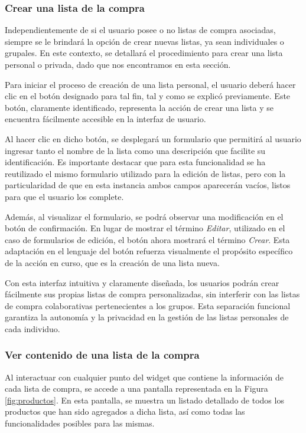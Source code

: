 \documentclass{article}
\begin{document}
\subsubsection{Crear una lista de la compra}

Independientemente de si el usuario posee o no listas de compra asociadas, siempre se le brindará la opción de crear nuevas listas, ya sean individuales o grupales. En este contexto, se detallará el procedimiento para crear una lista personal o privada, dado que nos encontramos en esta sección.

Para iniciar el proceso de creación de una lista personal, el usuario deberá hacer clic en el botón designado para tal fin, tal y como se explicó previamente. Este botón, claramente identificado, representa la acción de crear una lista y se encuentra fácilmente accesible en la interfaz de usuario.

Al hacer clic en dicho botón, se desplegará un formulario que permitirá al usuario ingresar tanto el nombre de la lista como una descripción que facilite su identificación. Es importante destacar que para esta funcionalidad se ha reutilizado el mismo formulario utilizado para la edición de listas, pero con la particularidad de que en esta instancia ambos campos aparecerán vacíos, listos para que el usuario los complete.

Además, al visualizar el formulario, se podrá observar una modificación en el botón de confirmación. En lugar de mostrar el término \textit{Editar}, utilizado en el caso de formularios de edición, el botón ahora mostrará el término \textit{Crear}. Esta adaptación en el lenguaje del botón refuerza visualmente el propósito específico de la acción en curso, que es la creación de una lista nueva.

Con esta interfaz intuitiva y claramente diseñada, los usuarios podrán crear fácilmente sus propias listas de compra personalizadas, sin interferir con las listas de compra colaborativas pertenecientes a los grupos. Esta separación funcional garantiza la autonomía y la privacidad en la gestión de las listas personales de cada individuo.

\subsubsection{Ver contenido de una lista de la compra}

Al interactuar con cualquier punto del widget que contiene la información de cada lista de compra, se accede a una pantalla representada en la Figura \ref{fig:productos}. En esta pantalla, se muestra un listado detallado de todos los productos que han sido agregados a dicha lista, así como todas las funcionalidades posibles para las mismas.
\end{document}
